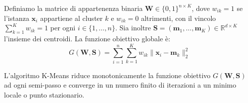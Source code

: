 Definiamo la matrice di appartenenza binaria $\mathbf{W} \in \{0, 1\}^{n \times K}$, dove $w_{ik} = 1$ se l'istanza $\mathbf{x}_i$ appartiene al cluster $k$ e $w_{ik} = 0$ altrimenti, con il vincolo $\sum_{k=1}^K w_{ik} = 1$ per ogni $i \in \{1, \dots, n\}$. Sia inoltre $\mathbf{S} = (\mathbf{m}_1, \dots, \mathbf{m}_K) \in \mathbb{R}^{d \times K}$ l'insieme dei centroidi. La funzione obiettivo globale è:
\begin{equation}
    G(\mathbf{W}, \mathbf{S}) = \sum_{i=1}^n \sum_{k=1}^K w_{ik} \|\mathbf{x}_i - \mathbf{m}_k\|_2^2
    \label{eq:dm-kmeans-coordinate-descent-obj}
\end{equation}

\begin{theorem}
L'algoritmo K-Means riduce monotonicamente la funzione obiettivo $G(\mathbf{W}, \mathbf{S})$ ad ogni semi-passo e converge in un numero finito di iterazioni a un minimo locale o punto stazionario.
\end{theorem}

